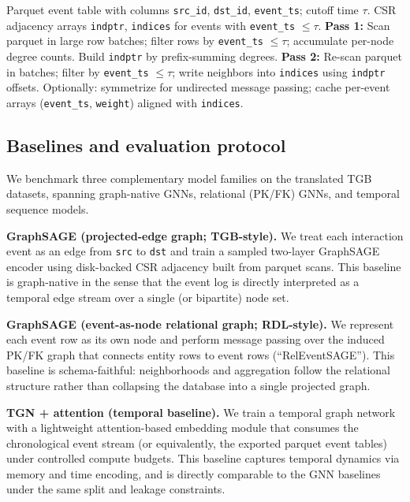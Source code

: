 \begin{algorithm}[t]
\caption{Streaming CSR construction from parquet event logs (sketch).}
\label{alg:csr_from_parquet}
\begin{algorithmic}[1]
\Require Parquet event table with columns \texttt{src\_id}, \texttt{dst\_id}, \texttt{event\_ts}; cutoff time $\tau$.
\Ensure CSR adjacency arrays \texttt{indptr}, \texttt{indices} for events with \texttt{event\_ts} $\le \tau$.
\State \textbf{Pass 1:} Scan parquet in large row batches; filter rows by \texttt{event\_ts} $\le \tau$; accumulate per-node degree counts.
\State Build \texttt{indptr} by prefix-summing degrees.
\State \textbf{Pass 2:} Re-scan parquet in batches; filter by \texttt{event\_ts} $\le \tau$; write neighbors into \texttt{indices} using \texttt{indptr} offsets.
\State Optionally: symmetrize for undirected message passing; cache per-event arrays (\texttt{event\_ts}, \texttt{weight}) aligned with \texttt{indices}.
\end{algorithmic}
\end{algorithm}


\subsection{Baselines and evaluation protocol} \label{sec:tgb_baselines}

  We benchmark three complementary model families on the translated TGB datasets, spanning graph-native GNNs, relational (PK/FK) GNNs, and temporal sequence models.

  \textbf{GraphSAGE (projected-edge graph; TGB-style).}
  We treat each interaction event as an edge from \texttt{src} to \texttt{dst} and train a sampled two-layer GraphSAGE encoder using disk-backed CSR adjacency built from parquet scans. This baseline is graph-native in the sense that the event log is
  directly interpreted as a temporal edge stream over a single (or bipartite) node set.

  \textbf{GraphSAGE (event-as-node relational graph; RDL-style).}
  We represent each event row as its own node and perform message passing over the induced PK/FK graph that connects entity rows to event rows (``RelEventSAGE''). This baseline is schema-faithful: neighborhoods and aggregation follow the relational
  structure rather than collapsing the database into a single projected graph.

  \textbf{TGN + attention (temporal baseline).}
  We train a temporal graph network with a lightweight attention-based embedding module that consumes the chronological event stream (or equivalently, the exported parquet event tables) under controlled compute budgets. This baseline captures temporal
  dynamics via memory and time encoding, and is directly comparable to the GNN baselines under the same split and leakage constraints.

